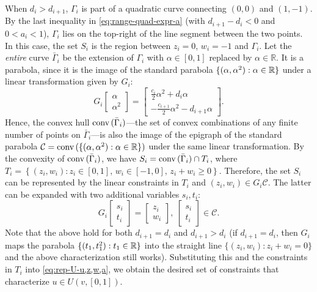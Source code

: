 	When $d_i > d_{i+1}$, $\Gamma_i$ is part of a quadratic curve connecting $(0,0)$ and $(1,-1)$.
	By the last inequality in \eqref{eq:range-quad-expr-a} (with $d_{i+1} - d_i < 0$ and $0<a_i<1$), $\Gamma_i$ lies on the top-right of the line segment between the two points.
	In this case, the set $S_i$ is the region between $z_i = 0$, $w_i =-1$ and $\Gamma_i$. 
	Let the \emph{entire} curve $\bar{\Gamma}_i$ be the extension of $\Gamma_i$ with $\alpha\in [0,1]$ replaced by $\alpha \in \mathbb{R}$.	
	It is a parabola, since it is the image of the standard parabola $\{ (\alpha, \alpha^2): \alpha\in \mathbb{R} \}$ under a linear transformation given by $G_i$:
	\[ G_i \begin{bmatrix}
		\alpha \\ \alpha^2
	\end{bmatrix} = \begin{bmatrix}
		\frac{c_i}{2} \alpha^2 + d_i \alpha \\
		-\frac{c_{i+1}}{2}\alpha^2 - d_{i+1} \alpha
	\end{bmatrix}. \]
	Hence, the convex hull $\textnormal{conv}\,(\bar{\Gamma}_i)$---the set of convex combinations of any finite number of points on $\bar{\Gamma}_i$---is also the image of the epigraph of the standard parabola $\mathcal{C}=\textnormal{conv}\,(\{ (\alpha, \alpha^2):\alpha\in \mathbb{R} \})$ under the same linear transformation. By the convexity of $\textnormal{conv}\,(\bar{\Gamma}_i)$, we have
	$S_i = \textnormal{conv}\,(\bar{\Gamma}_i) \cap T_i$,
	where 
	$T_i = \left\{ (z_i, w_i): z_i \in [0,1],\, w_i \in [-1,0],\, z_i + w_i \geq 0 \right\}$.
	Therefore, the set $S_i$ can be represented by the linear constraints in $T_i$ and $ (z_i, w_i)\in G_i \mathcal{C}$. 
	The latter can be expanded with two additional variables $s_i, t_i$:
	\[ G_i \begin{bmatrix}
		s_i \\ t_i
	\end{bmatrix} = \begin{bmatrix}
		z_i \\ w_i
	\end{bmatrix},\ \begin{bmatrix}
		s_i \\ t_i
	\end{bmatrix} \in \mathcal{C}. \]
	Note that the above hold for both $d_{i+1} = d_i$ and $d_{i+1} > d_i$ (if $d_{i+1} = d_i$, then $G_i$ maps the parabola $\{(t_1, t_1^2): t_1 \in \mathbb{R} \}$ into the straight line $\{ (z_i, w_i): z_i + w_i = 0 \}$ and the above characterization still works).
	Substituting this and the constraints in $T_i$ into \eqref{eq:rep-U-u,z,w,a}, we obtain the desired set of constraints that characterize $u\in U(v, [0,1])$.
	
